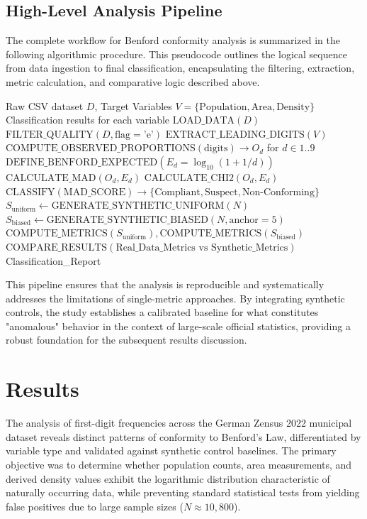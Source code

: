 \documentclass[11pt,a4paper]{article}
\begin{document}
\subsection{High-Level Analysis Pipeline}

The complete workflow for Benford conformity analysis is summarized in the following algorithmic procedure. This pseudocode outlines the logical sequence from data ingestion to final classification, encapsulating the filtering, extraction, metric calculation, and comparative logic described above.

\begin{algorithm}[t]
\caption{Benford Conformity Analysis}
\label{alg:benford_analysis}
\begin{algorithmic}[1]
\Require Raw CSV dataset $D$, Target Variables $V = \{\text{Population}, \text{Area}, \text{Density}\}$
\Ensure Classification results for each variable
\State $\text{LOAD\_DATA}(D)$
\State $\text{FILTER\_QUALITY}(D, \text{flag}=\text{'e'})$ 
\State $\text{EXTRACT\_LEADING\_DIGITS}(V)$ 
\State $\text{COMPUTE\_OBSERVED\_PROPORTIONS}(\text{digits}) \rightarrow O_d$ for $d \in 1..9$
\State $\text{DEFINE\_BENFORD\_EXPECTED}(E_d = \log_{10}(1 + 1/d))$
\State $\text{CALCULATE\_MAD}(O_d, E_d)$ 
\State $\text{CALCULATE\_CHI2}(O_d, E_d)$ 
\State $\text{CLASSIFY}(\text{MAD\_SCORE}) \rightarrow \{\text{Compliant}, \text{Suspect}, \text{Non-Conforming}\}$
\State $S_{\text{uniform}} \leftarrow \text{GENERATE\_SYNTHETIC\_UNIFORM}(N)$
\State $S_{\text{biased}} \leftarrow \text{GENERATE\_SYNTHETIC\_BIASED}(N, \text{anchor}=5)$
\State $\text{COMPUTE\_METRICS}(S_{\text{uniform}}), \text{COMPUTE\_METRICS}(S_{\text{biased}})$
\State $\text{COMPARE\_RESULTS}(\text{Real\_Data\_Metrics vs Synthetic\_Metrics})$
\State \Return Classification\_Report
\end{algorithmic}
\end{algorithm}

This pipeline ensures that the analysis is reproducible and systematically addresses the limitations of single-metric approaches. By integrating synthetic controls, the study establishes a calibrated baseline for what constitutes "anomalous" behavior in the context of large-scale official statistics, providing a robust foundation for the subsequent results discussion.

\section{Results}
The analysis of first-digit frequencies across the German Zensus 2022 municipal dataset reveals distinct patterns of conformity to Benford's Law, differentiated by variable type and validated against synthetic control baselines. The primary objective was to determine whether population counts, area measurements, and derived density values exhibit the logarithmic distribution characteristic of naturally occurring data, while preventing standard statistical tests from yielding false positives due to large sample sizes ($N \approx 10,800$).
\end{document}

